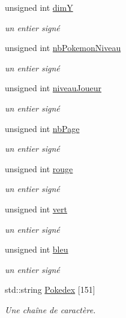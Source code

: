 \begin{DoxyCompactItemize}
unsigned int \hyperlink{class_s_f_m_l_pokedex_a1b01bf762bbe23e56fe0f5a7a767871b}{dimY}
\begin{DoxyCompactList}\small\item\em un entier signé \end{DoxyCompactList}\item 
unsigned int \hyperlink{class_s_f_m_l_pokedex_a13017856ab5c1378aadf46aa09c33b1c}{nb\+Pokemon\+Niveau}
\begin{DoxyCompactList}\small\item\em un entier signé \end{DoxyCompactList}\item 
unsigned int \hyperlink{class_s_f_m_l_pokedex_ae112351a9ce9d53bc25d4ffcb3f13d1c}{niveau\+Joueur}
\begin{DoxyCompactList}\small\item\em un entier signé \end{DoxyCompactList}\item 
unsigned int \hyperlink{class_s_f_m_l_pokedex_a054d94b92748c63069467337b15b3b81}{nb\+Page}
\begin{DoxyCompactList}\small\item\em un entier signé \end{DoxyCompactList}\item 
unsigned int \hyperlink{class_s_f_m_l_pokedex_a0c00916cec331e0b16f52744bca0978f}{rouge}
\begin{DoxyCompactList}\small\item\em un entier signé \end{DoxyCompactList}\item 
unsigned int \hyperlink{class_s_f_m_l_pokedex_aa310919f725f9aadde9a77849cb18bf5}{vert}
\begin{DoxyCompactList}\small\item\em un entier signé \end{DoxyCompactList}\item 
unsigned int \hyperlink{class_s_f_m_l_pokedex_a3d5463056d4494bdff42fdf7c79da5ff}{bleu}
\begin{DoxyCompactList}\small\item\em un entier signé \end{DoxyCompactList}\item 
std\+::string \hyperlink{class_s_f_m_l_pokedex_ad0c89f220e7cf46a05aa2ea8d68843d8}{Pokedex} \mbox{[}151\mbox{]}
\begin{DoxyCompactList}\small\item\em Une chaîne de caractère. \end{DoxyCompactList}\item 

\end{DoxyCompactItemize}
